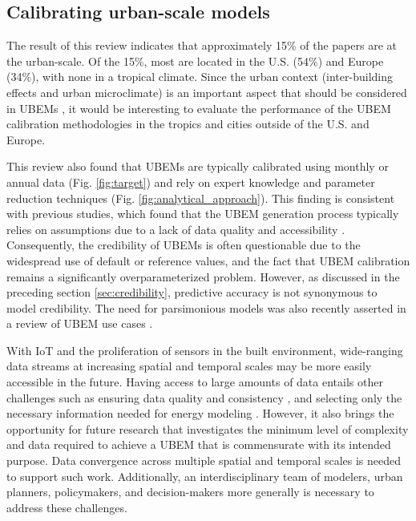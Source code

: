 \documentclass[review]{elsarticle}
\begin{document}
 
\subsection{Calibrating urban-scale models}

The result of this review indicates that approximately 15\% of the papers are at the urban-scale. Of the 15\%, most are located in the U.S. (54\%) and Europe (34\%), with none in a tropical climate. Since the urban context (inter-building effects and urban microclimate) is an important aspect that should be considered in UBEMs \cite{hong2020ten, miller2018urban}, it would be interesting to evaluate the performance of the UBEM calibration methodologies in the tropics and cities outside of the U.S. and Europe. 

This review also found that UBEMs are typically calibrated using monthly or annual data (Fig. \ref{fig:target}) and rely on expert knowledge and parameter reduction techniques (Fig. \ref{fig:analytical_approach}). This finding is consistent with previous studies, which found that the UBEM generation process typically relies on assumptions due to a lack of data quality and accessibility \cite{chen2019development, reinhart2016urban}. Consequently, the credibility of UBEMs is often questionable due to the widespread use of default or reference values, and the fact that UBEM calibration remains a significantly overparameterized problem. However, as discussed in the preceding section \ref{sec:credibility}, predictive accuracy is not synonymous to model credibility. The need for parsimonious models was also recently asserted in a review of UBEM use cases \cite{ang2020concept}.

With IoT and the proliferation of sensors in the built environment, wide-ranging data streams at increasing spatial and temporal scales may be more easily accessible in the future. Having access to large amounts of data entails other challenges such as ensuring data quality and consistency \cite{noardo2020tools, chen2019development}, and selecting only the necessary information needed for energy modeling \cite{biljecki2021extending}. However, it also brings the opportunity for future research that investigates the minimum level of complexity and data required to achieve a UBEM that is commensurate with its intended purpose. Data convergence across multiple spatial and temporal scales is needed to support such work. Additionally, an interdisciplinary team of modelers, urban planners, policymakers, and decision-makers more generally is necessary to address these challenges.
\end{document}
